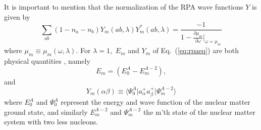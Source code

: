 It is important to mention that the normalization of the RPA wave 
functions $Y$ is given by
\begin{equation}
\sum _{ab}(1-n_a-n_b)Y_m(ab,\lambda)Y_m^*(ab,\lambda)
  =\frac{-1}{1-\frac{\partial \mu_m}{\partial \omega}
   \vert _{\omega=\mu _m}}
   \label{eq:rpanorm}
\end{equation}
where  $\mu_m\equiv\mu_m(\omega,\lambda)$.
For $\lambda =1, $ $E_m$ and $Y_m$ of Eq.\ (\ref{eq:rpaeq}) are both
physical quantities \cite{wukuo}, namely
\begin{equation}
  E_m=
 (E^{A}_{0}-E^{A-2}_{m}),
\end{equation}
and
\begin{equation}
Y_m(\alpha \beta)\equiv \langle \Psi^A_0
\vert a^+_{\alpha}a^+_{\beta}
\vert  \Psi ^{A-2}_m \rangle
\end{equation}
where $E^A_0$ and $\Psi ^A_0$ represent the energy and wave 
function of the nuclear matter ground state, and similarly 
$E^{A-2}_m$  and $\Psi ^{A-2}_m$  the m'th state of the 
nuclear matter system with two less nucleons.

